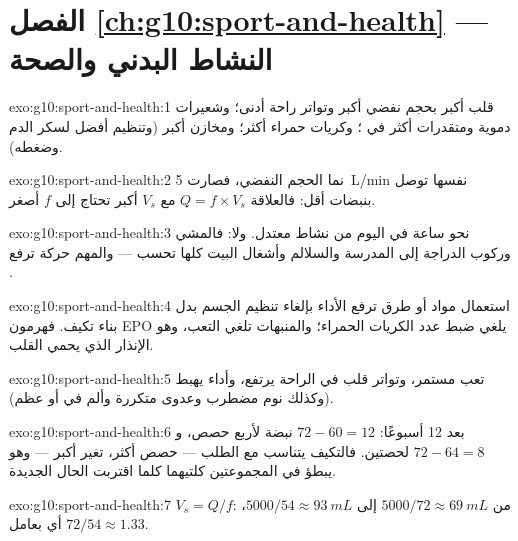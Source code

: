 \section*{الفصل \ref{ch:g10:sport-and-health} --- النشاط البدني والصحة}

\begin{solution}{exo:g10:sport-and-health:1}
قلب أكبر بحجم نفضي أكبر وتواتر راحة أدنى؛ وشعيرات دموية ومتقدرات أكثر
في ؛ وكريات حمراء أكثر؛ ومخازن  أكبر (وتنظيم
أفضل لسكر الدم وضغطه).
\end{solution}

\begin{solution}{exo:g10:sport-and-health:2}
نما الحجم النفضي، فصارت \qty{5}{L/min} نفسها توصل بنبضات أقل:
فالعلاقة $Q = f \times V_s$ مع $V_s$ أكبر تحتاج إلى $f$ أصغر.
\end{solution}

\begin{solution}{exo:g10:sport-and-health:3}
نحو ساعة في اليوم من نشاط معتدل. ولا: فالمشي وركوب الدراجة إلى
المدرسة والسلالم وأشغال البيت كلها تحسب --- والمهم حركة ترفع .
\end{solution}

\begin{solution}{exo:g10:sport-and-health:4}
استعمال مواد أو طرق ترفع الأداء بإلغاء تنظيم الجسم بدل بناء تكيف.
فهرمون EPO يلغي ضبط عدد الكريات الحمراء؛ والمنبهات تلغي التعب، وهو الإنذار
الذي يحمي القلب.
\end{solution}

\begin{solution}{exo:g10:sport-and-health:5}
تعب مستمر، وتواتر قلب في الراحة يرتفع، وأداء يهبط (وكذلك نوم مضطرب
وعدوى متكررة وألم في  أو عظم).
\end{solution}

\begin{solution}{exo:g10:sport-and-health:6}
بعد 12 أسبوعًا: $72 - 60 = 12$ نبضة لأربع حصص، و$72 - 64 = 8$ لحصتين.
فالتكيف يتناسب مع الطلب --- حصص أكثر، تغير أكبر --- وهو يبطؤ في
المجموعتين كلتيهما كلما اقتربت الحال الجديدة.
\end{solution}

\begin{solution}{exo:g10:sport-and-health:7}
$V_s = Q/f$: من $5000/72 \approx \qty{69}{mL}$ إلى $5000/54 \approx
\qty{93}{mL}$، أي بعامل $72/54 \approx 1.33$.
\end{solution}

